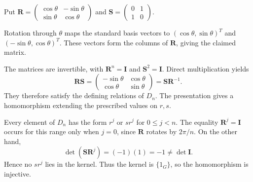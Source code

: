 \documentclass[11pt,oneside]{article}
\begin{document}
\begin{solution}
Put $\mathbf R=\begin{pmatrix}\cos\theta&-\sin\theta\\\sin\theta&\cos\theta\end{pmatrix}$ and $\mathbf S=\begin{pmatrix}0&1\\1&0\end{pmatrix}$.
\begin{exercisesubparts}
\item Rotation through $\theta$ maps the standard basis vectors to $(\cos\theta,\sin\theta)^T$ and $(-\sin\theta,\cos\theta)^T$. These vectors form the columns of $\mathbf R$, giving the claimed matrix.
\item The matrices are invertible, with $\mathbf R^n=\mathbf I$ and $\mathbf S^2=\mathbf I$. Direct multiplication yields
\[
\mathbf R\mathbf S=\begin{pmatrix}-\sin\theta&\cos\theta\\\cos\theta&\sin\theta\end{pmatrix}=\mathbf S\mathbf R^{-1}.
\]
They therefore satisfy the defining relations of $D_n$. The presentation gives a homomorphism extending the prescribed values on $r,s$.
\item Every element of $D_n$ has the form $r^j$ or $sr^j$ for $0\le j<n$. The equality $\mathbf R^j=\mathbf I$ occurs for this range only when $j=0$, since $\mathbf R$ rotates by $2\pi/n$. On the other hand,
\[
\det(\mathbf S\mathbf R^j)=(-1)(1)=-1\ne\det\mathbf I.
\]
Hence no $sr^j$ lies in the kernel. Thus the kernel is $\{1_G\}$, so the homomorphism is injective.
\end{exercisesubparts}
\end{solution}
\end{document}
